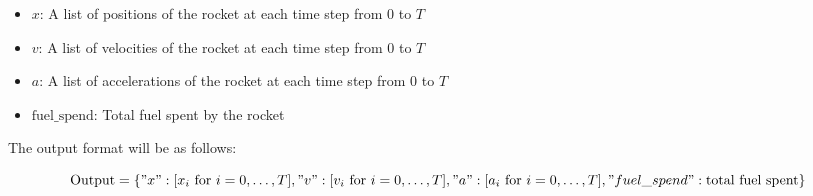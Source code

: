 \documentclass{article}
\begin{document}
\begin{itemize}
    \item \( x \): A list of positions of the rocket at each time step from 0 to \( T \)
    \item \( v \): A list of velocities of the rocket at each time step from 0 to \( T \)
    \item \( a \): A list of accelerations of the rocket at each time step from 0 to \( T \)
    \item \( \text{fuel\_spend} \): Total fuel spent by the rocket
\end{itemize}

The output format will be as follows:

\[
\text{Output} = \{
    "x": [x_i \text{ for } i = 0, \ldots, T],
    "v": [v_i \text{ for } i = 0, \ldots, T],
    "a": [a_i \text{ for } i = 0, \ldots, T],
    "fuel\_spend": \text{total fuel spent}
\}
\]
\end{document}
